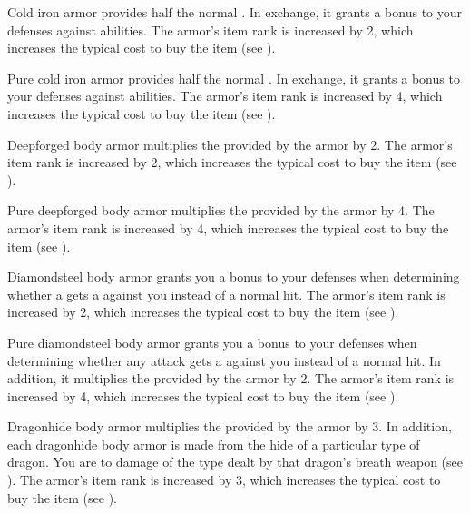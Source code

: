          Cold iron armor provides half the normal .
        In exchange, it grants a  bonus to your defenses against  abilities.
        The armor's item rank is increased by 2, which increases the typical cost to buy the item (see ).

         Pure cold iron armor provides half the normal .
        In exchange, it grants a  bonus to your defenses against  abilities.
        The armor's item rank is increased by 4, which increases the typical cost to buy the item (see ).

         Deepforged body armor multiplies the  provided by the armor by 2.
        The armor's item rank is increased by 2, which increases the typical cost to buy the item (see ).

         Pure deepforged body armor multiplies the  provided by the armor by 4.
        The armor's item rank is increased by 4, which increases the typical cost to buy the item (see ).

         Diamondsteel body armor grants you a  bonus to your defenses when determining whether a  gets a  against you instead of a normal hit.
        The armor's item rank is increased by 2, which increases the typical cost to buy the item (see ).

         Pure diamondsteel body armor grants you a  bonus to your defenses when determining whether any attack gets a  against you instead of a normal hit.
        In addition, it multiplies the  provided by the armor by 2.
        The armor's item rank is increased by 4, which increases the typical cost to buy the item (see ).

         Dragonhide body armor multiplies the  provided by the armor by 3.
        In addition, each dragonhide body armor is made from the hide of a particular type of dragon.
        You are  to damage of the type dealt by that dragon's breath weapon (see ).
        The armor's item rank is increased by 3, which increases the typical cost to buy the item (see ).

